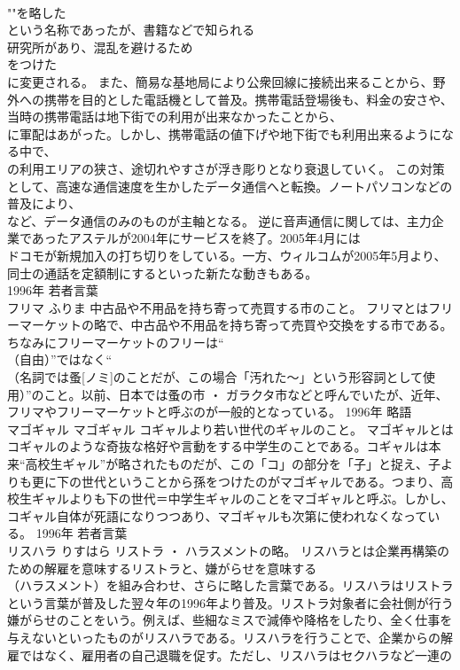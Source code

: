 \documentclass[8pt]{extreport}
\begin{document}
\begin{CJK}{UTF8}{min}
\\	""を略した
\\	という名称であったが、書籍などで知られる
\\	研究所があり、混乱を避けるため
\\	をつけた
\\	に変更される。 また、簡易な基地局により公衆回線に接続出来ることから、野外への携帯を目的とした電話機として普及。携帯電話登場後も、料金の安さや、当時の携帯電話は地下街での利用が出来なかったことから、
\\	に軍配はあがった。しかし、携帯電話の値下げや地下街でも利用出来るようになる中で、
\\	の利用エリアの狭さ、途切れやすさが浮き彫りとなり衰退していく。 この対策として、高速な通信速度を生かしたデータ通信へと転換。ノートパソコンなどの普及により、
\\	など、データ通信のみのものが主軸となる。 逆に音声通信に関しては、主力企業であったアステルが2004年にサービスを終了。2005年4月には
\\	ドコモが新規加入の打ち切りをしている。一方、ウィルコムが2005年5月より、
\\	同士の通話を定額制にするといった新たな動きもある。
\\	1996年	若者言葉	
\\	フリマ	ふりま	中古品や不用品を持ち寄って売買する市のこと。	フリマとはフリーマーケットの略で、中古品や不用品を持ち寄って売買や交換をする市である。ちなみにフリーマーケットのフリーは“
\\	（自由）”ではなく“
\\	（名詞では蚤[ノミ]のことだが、この場合「汚れた～」という形容詞として使用）”のこと。以前、日本では蚤の市 ・ ガラクタ市などと呼んでいたが、近年、フリマやフリーマーケットと呼ぶのが一般的となっている。	1996年	略語	
\\	マゴギャル	マゴギャル	コギャルより若い世代のギャルのこと。	マゴギャルとはコギャルのような奇抜な格好や言動をする中学生のことである。コギャルは本来“高校生ギャル”が略されたものだが、この「コ」の部分を「子」と捉え、子よりも更に下の世代ということから孫をつけたのがマゴギャルである。つまり、高校生ギャルよりも下の世代＝中学生ギャルのことをマゴギャルと呼ぶ。しかし、コギャル自体が死語になりつつあり、マゴギャルも次第に使われなくなっている。	1996年	若者言葉	
\\	リスハラ	りすはら	リストラ ・ ハラスメントの略。	リスハラとは企業再構築のための解雇を意味するリストラと、嫌がらせを意味する
\\	（ハラスメント）を組み合わせ、さらに略した言葉である。リスハラはリストラという言葉が普及した翌々年の1996年より普及。リストラ対象者に会社側が行う嫌がらせのことをいう。例えば、些細なミスで減俸や降格をしたり、全く仕事を与えないといったものがリスハラである。リスハラを行うことで、企業からの解雇ではなく、雇用者の自己退職を促す。ただし、リスハラはセクハラなど一連の

\end{CJK}
\end{document}
